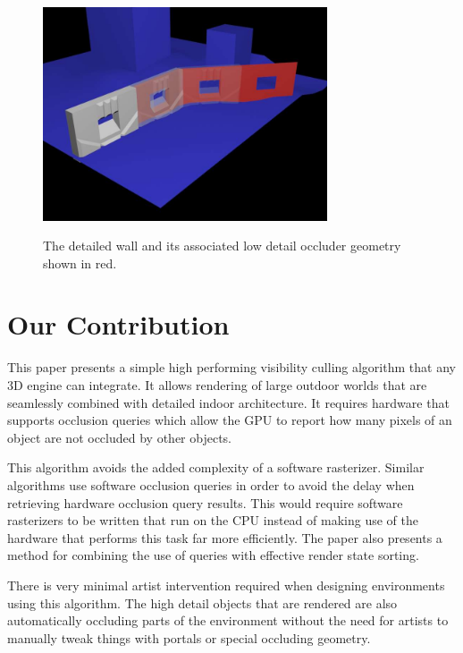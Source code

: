 \documentclass[12pt]{ucthesis}
\newcommand{\captionfonts}{\small\bf\ssp}
\begin{document}
\begin{figure}
\begin{center}
\includegraphics[width=0.75\textwidth]{Images/OccluderGeomFig.jpg}
\captionfonts
\caption[Occluder Geometry]{The detailed wall and its associated low detail occluder geometry shown in red.}
\label{fig:occluder-geometry}
\end{center}
\end{figure}

\section{Our Contribution}
\label{our-contribution}
This paper presents a simple high performing visibility culling algorithm that any 3D engine can integrate.
It allows rendering of large outdoor worlds that are seamlessly combined with detailed indoor architecture.
It requires hardware that supports occlusion queries which allow the GPU to report how many pixels of an object are not occluded by other objects.\cite{GpuGem-Queries}

This algorithm avoids the added complexity of a software rasterizer.
Similar algorithms use software occlusion queries in order to avoid the delay when retrieving hardware occlusion query results.\cite{culling-bf}
This would require software rasterizers to be written that run on the CPU instead of making use of the hardware that performs this task far more efficiently.
The paper also presents a method for combining the use of queries with effective render state sorting.

There is very minimal artist intervention required when designing environments using this algorithm.
The high detail objects that are rendered are also automatically occluding parts of the environment without the need for artists to manually tweak things with portals or special occluding geometry.
\end{document}
